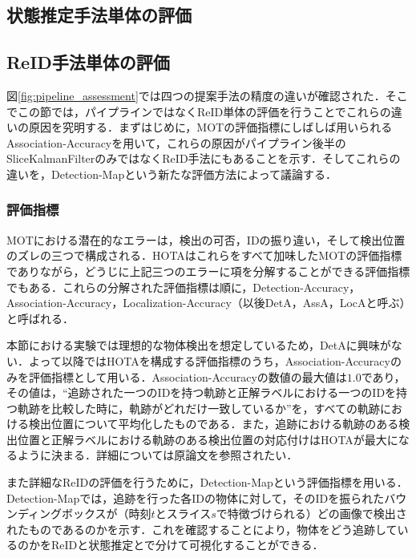     \subsection{状態推定手法単体の評価}
    \label{subsec:evaluate_estimation}


    \subsection{ReID手法単体の評価}
    \label{subsec:evaluate_reidentification}

    図\ref{fig:pipeline_assessment}では四つの提案手法の精度の違いが確認された．そこでこの節では，パイプラインではなくReID単体の評価を行うことでこれらの違いの原因を究明する．まずはじめに，MOTの評価指標にしばしば用いられるAssociation-Accuracyを用いて，これらの原因がパイプライン後半のSliceKalmanFilterのみではなくReID手法にもあることを示す．そしてこれらの違いを，Detection-Mapという新たな評価方法によって議論する．

        \subsubsection{評価指標}
        
        MOTにおける潜在的なエラーは，検出の可否，IDの振り違い，そして検出位置のズレの三つで構成される．HOTA\cite{luiten2021hota}はこれらをすべて加味したMOTの評価指標でありながら，どうじに上記三つのエラーに項を分解することができる評価指標でもある．これらの分解された評価指標は順に，Detection-Accuracy，Association-Accuracy，Localization-Accuracy（以後DetA，AssA，LocAと呼ぶ）と呼ばれる．

        本節における実験では理想的な物体検出を想定しているため，DetAに興味がない．よって以降ではHOTAを構成する評価指標のうち，Association-Accuracyのみを評価指標として用いる．Association-Accuracyの数値の最大値は$1.0$であり，その値は，``追跡された一つのIDを持つ軌跡と正解ラベルにおける一つのIDを持つ軌跡を比較した時に，軌跡がどれだけ一致しているか''を，すべての軌跡における検出位置について平均化したものである．また，追跡における軌跡のある検出位置と正解ラベルにおける軌跡のある検出位置の対応付けはHOTAが最大になるように決まる．詳細については原論文\cite{luiten2021hota}を参照されたい．

        また詳細なReIDの評価を行うために，Detection-Mapという評価指標を用いる．Detection-Mapでは，追跡を行った各IDの物体に対して，そのIDを振られたバウンディングボックスが（時刻$t$とスライス$s$で特徴づけられる）どの画像で検出されたものであるのかを示す．これを確認することにより，物体をどう追跡しているのかをReIDと状態推定とで分けて可視化することができる．

